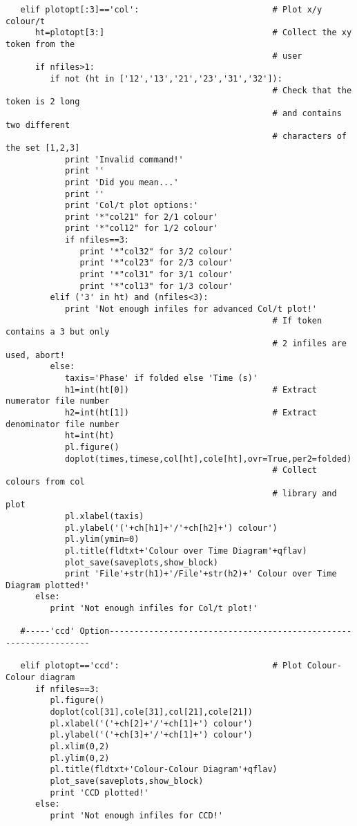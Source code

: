 \begin{verbatim}
   elif plotopt[:3]=='col':                           # Plot x/y colour/t
      ht=plotopt[3:]                                  # Collect the xy token from the
                                                      # user
      if nfiles>1:
         if not (ht in ['12','13','21','23','31','32']):
                                                      # Check that the token is 2 long
                                                      # and contains two different
                                                      # characters of the set [1,2,3]
            print 'Invalid command!'
            print ''
            print 'Did you mean...'
            print ''
            print 'Col/t plot options:'
            print '*"col21" for 2/1 colour'
            print '*"col12" for 1/2 colour'
            if nfiles==3:
               print '*"col32" for 3/2 colour'
               print '*"col23" for 2/3 colour'
               print '*"col31" for 3/1 colour'
               print '*"col13" for 1/3 colour'
         elif ('3' in ht) and (nfiles<3):
            print 'Not enough infiles for advanced Col/t plot!'
                                                      # If token contains a 3 but only
                                                      # 2 infiles are used, abort!
         else:
            taxis='Phase' if folded else 'Time (s)'
            h1=int(ht[0])                             # Extract numerator file number
            h2=int(ht[1])                             # Extract denominator file number
            ht=int(ht)
            pl.figure()
            doplot(times,timese,col[ht],cole[ht],ovr=True,per2=folded)
                                                      # Collect colours from col
                                                      # library and plot
            pl.xlabel(taxis)
            pl.ylabel('('+ch[h1]+'/'+ch[h2]+') colour')
            pl.ylim(ymin=0)
            pl.title(fldtxt+'Colour over Time Diagram'+qflav)
            plot_save(saveplots,show_block)
            print 'File'+str(h1)+'/File'+str(h2)+' Colour over Time Diagram plotted!'
      else:
         print 'Not enough infiles for Col/t plot!'

   #-----'ccd' Option------------------------------------------------------------------

   elif plotopt=='ccd':                               # Plot Colour-Colour diagram
      if nfiles==3:
         pl.figure()
         doplot(col[31],cole[31],col[21],cole[21])
         pl.xlabel('('+ch[2]+'/'+ch[1]+') colour')
         pl.ylabel('('+ch[3]+'/'+ch[1]+') colour')
         pl.xlim(0,2)
         pl.ylim(0,2)
         pl.title(fldtxt+'Colour-Colour Diagram'+qflav)
         plot_save(saveplots,show_block)
         print 'CCD plotted!'
      else:
         print 'Not enough infiles for CCD!'


\end{verbatim}
